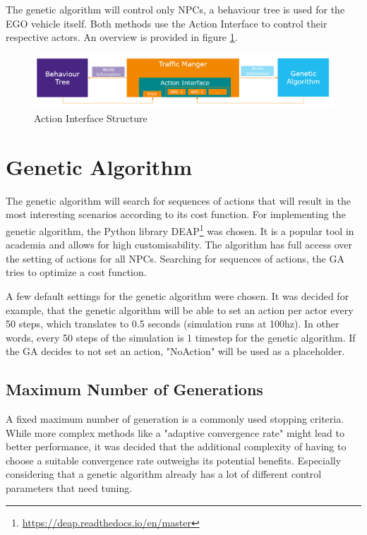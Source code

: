 The genetic algorithm will control only NPCs, a behaviour tree is used for the EGO vehicle itself. Both methods use the Action Interface to control their respective actors. An overview is provided in figure \ref{figure:traffic_manager:structure}.

\begin{figure}[ht] 
	\includegraphics[width=1\linewidth]{figures/tm_structure}
	\caption{Action Interface Structure}
	\label{figure:traffic_manager:structure}
\end{figure}

\section{Genetic Algorithm}
The genetic algorithm will search for sequences of actions that will result in the most interesting scenarios according to its cost function.
For implementing the genetic algorithm, the Python library DEAP\footnote{\url{https://deap.readthedocs.io/en/master}} was chosen. It is a popular tool in academia and allows for high customisability.
The algorithm has full access over the setting of actions for all NPCs. Searching for sequences of actions, the GA tries to optimize a cost function.

A few default settings for the genetic algorithm were chosen. It was decided for example, that the genetic algorithm will be able to set an action per actor every 50 steps, which translates to 0.5 seconds (simulation runs at 100hz). In other words, every 50 steps of the simulation is 1 timestep for the genetic algorithm. If the GA decides to not set an action, "NoAction" will be used as a placeholder.

\subsection{Maximum Number of Generations}
A fixed maximum number of generation is a commonly used stopping criteria. While more complex methods like a "adaptive convergence rate" might lead to better performance, it was decided that the additional complexity of having to choose a suitable convergence rate outweighs its potential benefits. Especially considering that a genetic algorithm already has a lot of different control parameters that need tuning.

